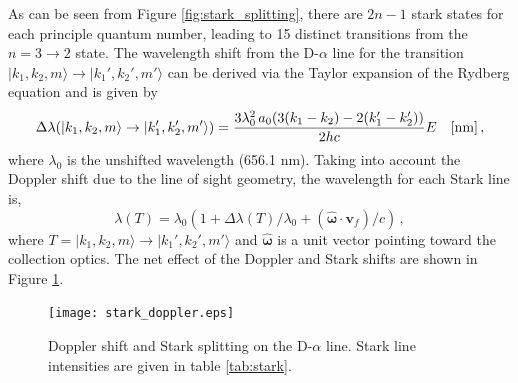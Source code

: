 As can be seen from Figure \ref{fig:stark_splitting}, there are $2n-1$ stark states for each principle quantum number, leading to 15 distinct transitions from the $n=3 \rightarrow 2$ state. The wavelength shift from the D-$\alpha$ line for the transition $|k_1,k_2,m\rangle \rightarrow |k_1',k_2',m'\rangle$ can be derived via the Taylor expansion of the Rydberg equation and is given by
\begin{equation}\label{eq:stark_lambda}
    \Delta \lambda(|k_1,k_2,m\rangle \rightarrow |k_1',k_2',m'\rangle) = \frac{3 \lambda_{0}^2\,a_0 (3(k_1-k_2) - 2(k_1' - k_2'))}{2hc} E \quad \rm{[nm]}\,,
\end{equation}
where $\lambda_0$ is the unshifted wavelength (656.1 nm).
Taking into account the Doppler shift due to the line of sight geometry, the wavelength for each Stark line is,
\begin{equation}\label{eq:wavelengths}
    \lambda(T) = \lambda_0 (1 + \Delta \lambda(T)/\lambda_0 + (\boldsymbol{\hat{\omega}} \cdot \mathbf{v}_f)/c)\,,
\end{equation}
where $T =|k_1,k_2,m\rangle \rightarrow |k_1',k_2',m'\rangle$ and $\boldsymbol{\hat{\omega}}$ is a unit vector pointing toward the collection optics. The net effect of the Doppler and Stark shifts are shown in Figure \ref{fig:stark_doppler}.
\begin{figure}[ht]
    \centering
    \texttt{[image: stark\_doppler.eps]}
    \caption{Doppler shift and Stark splitting on the D-$\alpha$ line. Stark line intensities are given in table \ref{tab:stark}.}
    \label{fig:stark_doppler}
\end{figure}

